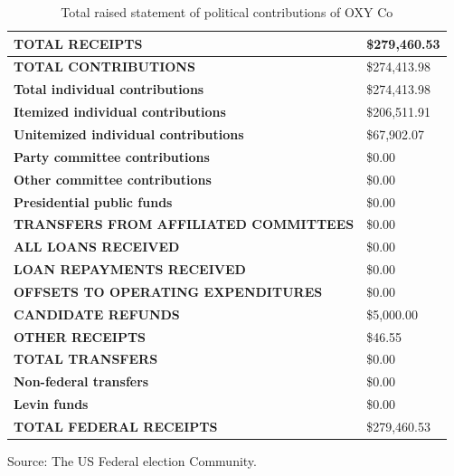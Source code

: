 \documentclass[
	a4paper, %
	12pt,%
]{CSSullivanBusinessReport}
\begin{document}
\begin{fullwidth}
\begin{appendices}
\begin{table}[!ht]\footnotesize
    \centering
    \caption{Total raised statement of political contributions of OXY Co}
    \begin{tabular}{ll}
    \hline
        \textbf{TOTAL RECEIPTS} & \textbf{\$279,460.53  } \\ \hline
        \quad \textbf{TOTAL CONTRIBUTIONS} & \$274,413.98   \\ 
        \quad \quad \textbf{Total individual contributions} & \$274,413.98   \\ 
        \quad \quad \textbf{Itemized individual contributions} & \$206,511.91   \\ 
        \quad \textbf{Unitemized individual contributions} & \$67,902.07   \\ 
        \quad \textbf{Party committee contributions} & \$0.00   \\ 
        \quad \textbf{Other committee contributions} & \$0.00   \\ 
        \textbf{Presidential public funds} & \$0.00   \\ 
        \textbf{TRANSFERS FROM AFFILIATED COMMITTEES} & \$0.00   \\ 
        \textbf{ALL LOANS RECEIVED} & \$0.00   \\ 
        \textbf{LOAN REPAYMENTS RECEIVED} & \$0.00   \\ 
        \textbf{OFFSETS TO OPERATING EXPENDITURES} & \$0.00   \\ 
        \textbf{CANDIDATE REFUNDS} & \$5,000.00   \\ 
        \textbf{OTHER RECEIPTS} & \$46.55   \\ 
        \textbf{TOTAL TRANSFERS} & \$0.00   \\ 
        \quad \textbf{Non-federal transfers} & \$0.00   \\ 
        \quad \textbf{Levin funds} & \$0.00   \\ \hline
        \textbf{TOTAL FEDERAL RECEIPTS} & \$279,460.53 \\ \hline
    \end{tabular}
    \label{totalraised}
    Source: The US Federal election Community.
\end{table}


\end{appendices}
\end{fullwidth}
\end{document}
